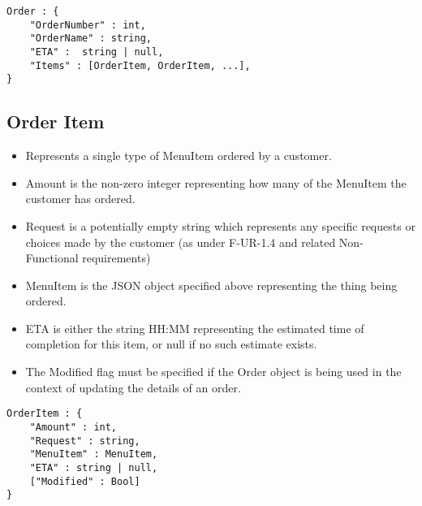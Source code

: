 \documentclass[12pt, a4paper]{article}
\begin{document}
\begin{verbatim}
Order : {
	"OrderNumber" : int,
	"OrderName" : string,
	"ETA" :  string | null,
	"Items" : [OrderItem, OrderItem, ...],
}
\end{verbatim}

\subsection{Order Item}

\begin{itemize}
\item Represents a single type of MenuItem ordered by a customer.
\item Amount is the non-zero integer representing how many of the MenuItem the customer has ordered.
\item Request is a potentially empty string which represents any specific requests or choices made by the customer (as under F-UR-1.4 and related Non-Functional requirements)
\item MenuItem is the JSON object specified above representing the thing being ordered.
\item ETA is either the string HH:MM representing the estimated time of completion for this item, or null if no such estimate exists.
\item The Modified flag must be specified if the Order object is being used in the context of updating the details of an order.
\end{itemize}

\begin{verbatim}
OrderItem : {
	"Amount" : int,
	"Request" : string,
	"MenuItem" : MenuItem,
	"ETA" : string | null,
	["Modified" : Bool]
}
\end{verbatim}
\end{document}
